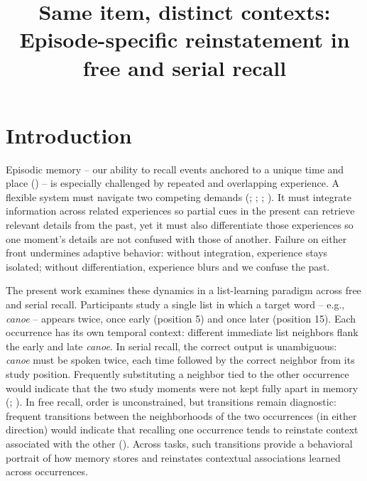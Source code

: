 \documentclass[
  man,
  floatsintext,
  longtable,
  nolmodern,
  notxfonts,
  notimes,
  draftfirst,
  colorlinks=true,linkcolor=blue,citecolor=blue,urlcolor=blue]{apa7}
\title{Same item, distinct contexts: Episode-specific reinstatement in
free and serial recall}
\begin{document}
\maketitle


\setcounter{secnumdepth}{-\maxdimen} %

\setlength\LTleft{0pt}


\section{Introduction}\label{introduction}

Episodic memory -- our ability to recall events anchored to a unique
time and place () -- is especially challenged by repeated and overlapping
experience. A flexible system must navigate two competing demands
(;
;
;
). It must
integrate information across related experiences so partial cues in the
present can retrieve relevant details from the past, yet it must also
differentiate those experiences so one moment's details are not confused
with those of another. Failure on either front undermines adaptive
behavior: without integration, experience stays isolated; without
differentiation, experience blurs and we confuse the past.

The present work examines these dynamics in a list-learning paradigm
across free and serial recall. Participants study a single list in which
a target word -- e.g., \emph{canoe} -- appears twice, once early
(position 5) and once later (position 15). Each occurrence has its own
temporal context: different immediate list neighbors flank the early and
late \emph{canoe}. In serial recall, the correct output is unambiguous:
\emph{canoe} must be spoken twice, each time followed by the correct
neighbor from its study position. Frequently substituting a neighbor
tied to the other occurrence would indicate that the two study moments
were not kept fully apart in memory
(;
). In free
recall, order is unconstrained, but transitions remain diagnostic:
frequent transitions between the neighborhoods of the two occurrences
(in either direction) would indicate that recalling one occurrence tends
to reinstate context associated with the other
(). Across
tasks, such transitions provide a behavioral portrait of how memory
stores and reinstates contextual associations learned across
occurrences.
\end{document}
